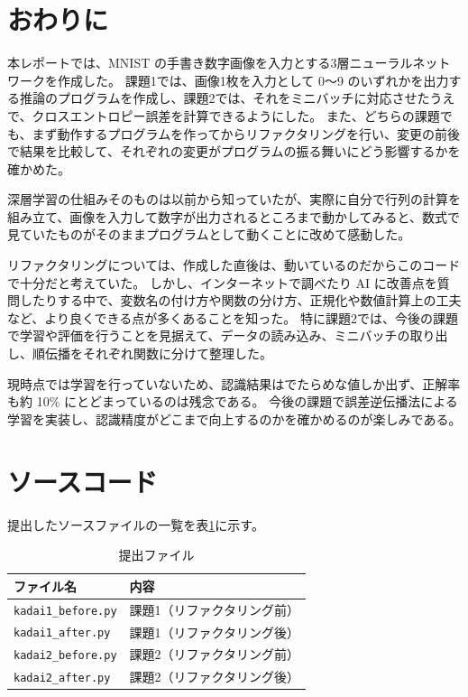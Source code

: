 \documentclass[a4paper,11pt]{ltjsarticle}
\begin{document}
\section{おわりに}
本レポートでは、MNIST の手書き数字画像を入力とする3層ニューラルネットワークを作成した。
課題1では、画像1枚を入力として 0～9 のいずれかを出力する推論のプログラムを作成し、課題2では、それをミニバッチに対応させたうえで、クロスエントロピー誤差を計算できるようにした。
また、どちらの課題でも、まず動作するプログラムを作ってからリファクタリングを行い、変更の前後で結果を比較して、それぞれの変更がプログラムの振る舞いにどう影響するかを確かめた。

深層学習の仕組みそのものは以前から知っていたが、実際に自分で行列の計算を組み立て、画像を入力して数字が出力されるところまで動かしてみると、数式で見ていたものがそのままプログラムとして動くことに改めて感動した。

リファクタリングについては、作成した直後は、動いているのだからこのコードで十分だと考えていた。
しかし、インターネットで調べたり AI に改善点を質問したりする中で、変数名の付け方や関数の分け方、正規化や数値計算上の工夫など、より良くできる点が多くあることを知った。
特に課題2では、今後の課題で学習や評価を行うことを見据えて、データの読み込み、ミニバッチの取り出し、順伝播をそれぞれ関数に分けて整理した。

現時点では学習を行っていないため、認識結果はでたらめな値しか出ず、正解率も約 10\% にとどまっているのは残念である。
今後の課題で誤差逆伝播法による学習を実装し、認識精度がどこまで向上するのかを確かめるのが楽しみである。

\appendix
\section{ソースコード}
提出したソースファイルの一覧を表\ref{tab:files}に示す。
\begin{table}[H]
  \centering
  \caption{提出ファイル}
  \label{tab:files}
  \begin{tabular}{ll}
    \toprule
    ファイル名 & 内容 \\
    \midrule
    \texttt{kadai1\_before.py} & 課題1（リファクタリング前） \\
    \texttt{kadai1\_after.py}  & 課題1（リファクタリング後） \\
    \texttt{kadai2\_before.py} & 課題2（リファクタリング前） \\
    \texttt{kadai2\_after.py}  & 課題2（リファクタリング後） \\
    \bottomrule
  \end{tabular}
\end{table}
\end{document}
